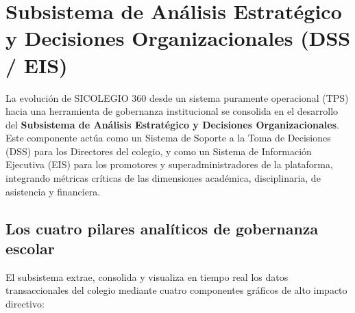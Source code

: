 \documentclass[12pt,a4paper,oneside]{report}
\begin{document}
\section{Subsistema de Análisis Estratégico y Decisiones Organizacionales (DSS / EIS)}

La evolución de SICOLEGIO 360 desde un sistema puramente operacional (TPS) hacia una herramienta de gobernanza institucional se consolida en el desarrollo del \textbf{Subsistema de Análisis Estratégico y Decisiones Organizacionales}. Este componente actúa como un Sistema de Soporte a la Toma de Decisiones (DSS) para los Directores del colegio, y como un Sistema de Información Ejecutiva (EIS) para los promotores y superadministradores de la plataforma, integrando métricas críticas de las dimensiones académica, disciplinaria, de asistencia y financiera.

\subsection{Los cuatro pilares analíticos de gobernanza escolar}
El subsistema extrae, consolida y visualiza en tiempo real los datos transaccionales del colegio mediante cuatro componentes gráficos de alto impacto directivo:
\end{document}
